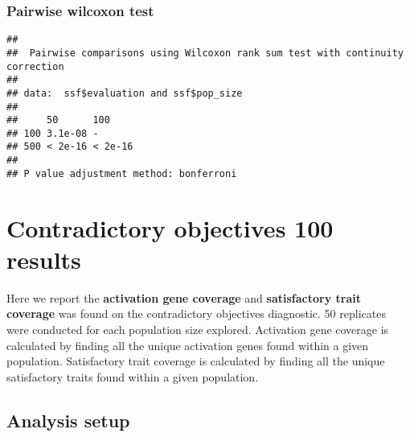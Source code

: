 \documentclass[
]{book}
\newenvironment{Shaded}{\begin{snugshade}}{\end{snugshade}}
\newcommand{\AttributeTok}[1]{\textcolor[rgb]{0.13,0.29,0.53}{#1}}
\newcommand{\ConstantTok}[1]{\textcolor[rgb]{0.56,0.35,0.01}{#1}}
\newcommand{\FunctionTok}[1]{\textcolor[rgb]{0.13,0.29,0.53}{\textbf{#1}}}
\newcommand{\NormalTok}[1]{#1}
\newcommand{\SpecialCharTok}[1]{\textcolor[rgb]{0.81,0.36,0.00}{\textbf{#1}}}
\newcommand{\StringTok}[1]{\textcolor[rgb]{0.31,0.60,0.02}{#1}}
\begin{document}
\hypertarget{pairwise-wilcoxon-test-1}{%
\subsection{Pairwise wilcoxon test}\label{pairwise-wilcoxon-test-1}}

\begin{Shaded}
\end{Shaded}

\begin{verbatim}
## 
##  Pairwise comparisons using Wilcoxon rank sum test with continuity correction 
## 
## data:  ssf$evaluation and ssf$pop_size 
## 
##     50      100    
## 100 3.1e-08 -      
## 500 < 2e-16 < 2e-16
## 
## P value adjustment method: bonferroni
\end{verbatim}

\hypertarget{contradictory-objectives-100-results}{%
\chapter{Contradictory objectives 100 results}\label{contradictory-objectives-100-results}}

Here we report the \textbf{activation gene coverage} and \textbf{satisfactory trait coverage} was found on the contradictory objectives diagnostic.
50 replicates were conducted for each population size explored.
Activation gene coverage is calculated by finding all the unique activation genes found within a given population.
Satisfactory trait coverage is calculated by finding all the unique satisfactory traits found within a given population.

\hypertarget{analysis-setup-1}{%
\section{Analysis setup}\label{analysis-setup-1}}
\end{document}
